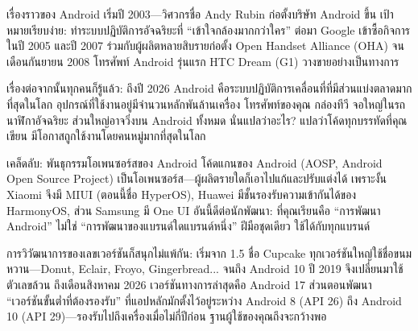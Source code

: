 


เรื่องราวของ Android เริ่มปี 2003—วิศวกรชื่อ Andy Rubin ก่อตั้งบริษัท Android ขึ้น เป้าหมายเรียบง่าย: ทำระบบปฏิบัติการอัจฉริยะที่ “เข้าใจกล้องมากกว่าใคร” ต่อมา Google เข้าซื้อกิจการในปี 2005 และปี 2007 ร่วมกับผู้ผลิตหลายสิบรายก่อตั้ง Open Handset Alliance (OHA) จนเดือนกันยายน 2008 โทรศัพท์ Android รุ่นแรก HTC Dream (G1) วางขายอย่างเป็นทางการ

เรื่องต่อจากนั้นทุกคนก็รู้แล้ว: ถึงปี 2026 Android คือระบบปฏิบัติการเคลื่อนที่ที่มีส่วนแบ่งตลาดมากที่สุดในโลก อุปกรณ์ที่ใช้งานอยู่มีจำนวนหลักพันล้านเครื่อง โทรศัพท์ของคุณ กล่องทีวี จอใหญ่ในรถ นาฬิกาอัจฉริยะ ส่วนใหญ่อาจวิ่งบน Android ทั้งหมด นั่นแปลว่าอะไร? แปลว่าโค้ดทุกบรรทัดที่คุณเขียน มีโอกาสถูกใช้งานโดยคนหมู่มากที่สุดในโลก

\begin{tcbinfo}{เคล็ดลับ: พันธุกรรมโอเพนซอร์สของ Android}
โค้ดแกนของ Android (AOSP, Android Open Source Project) เป็นโอเพนซอร์ส—ผู้ผลิตรายใดก็เอาไปแก้และปรับแต่งได้ เพราะงั้น Xiaomi จึงมี MIUI (ตอนนี้ชื่อ HyperOS), Huawei มีชั้นรองรับความเข้ากันได้ของ HarmonyOS, ส่วน Samsung มี One UI อันนี้ดีต่อนักพัฒนา: ที่คุณเรียนคือ “การพัฒนา Android” ไม่ใช่ “การพัฒนาของแบรนด์ใดแบรนด์หนึ่ง” ฝีมือชุดเดียว ใช้ได้กับทุกแบรนด์

\end{tcbinfo}

การวิวัฒนาการของเลขเวอร์ชันก็สนุกไม่แพ้กัน: เริ่มจาก 1.5 ชื่อ Cupcake ทุกเวอร์ชันใหญ่ใช้ชื่อขนมหวาน—Donut, Eclair, Froyo, Gingerbread... จนถึง Android 10 ปี 2019 จึงเปลี่ยนมาใช้ตัวเลขล้วน ถึงเดือนสิงหาคม 2026 เวอร์ชันทางการล่าสุดคือ Android 17 ส่วนตอนพัฒนา “เวอร์ชันขั้นต่ำที่ต้องรองรับ” ที่แอปหลักมักตั้งไว้อยู่ระหว่าง Android 8 (API 26) ถึง Android 10 (API 29)—รองรับไปถึงเครื่องเมื่อไม่กี่ปีก่อน ฐานผู้ใช้ของคุณถึงจะกว้างพอ

